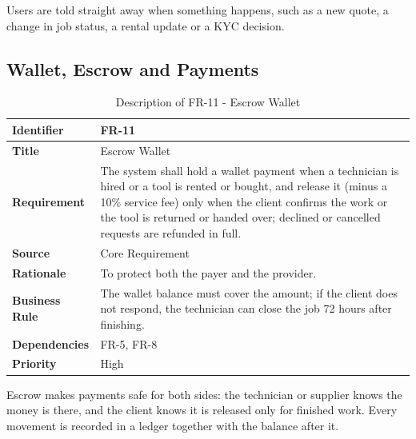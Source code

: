 \documentclass[A4paper,12pt]{report}
\theoremstyle{plain}
\theoremstyle{definition}
\theoremstyle{remark}
\numberwithin{equation}{section}
\begin{document}
Users are told straight away when something happens, such as a new quote, a change in job status, a rental update or a KYC decision.

\subsection{Wallet, Escrow and Payments}

\begin{table}[h!]
\centering
\caption{Description of FR-11 - Escrow Wallet}
\begin{tabular}{|p{}|p{}|}
\hline
\textbf{Identifier} & FR-11 \\ \hline
\textbf{Title} & Escrow Wallet \\ \hline
\textbf{Requirement} & The system shall hold a wallet payment when a technician is hired or a tool is rented or bought, and release it (minus a 10\% service fee) only when the client confirms the work or the tool is returned or handed over; declined or cancelled requests are refunded in full. \\ \hline
\textbf{Source} & Core Requirement \\ \hline
\textbf{Rationale} & To protect both the payer and the provider. \\ \hline
\textbf{Business Rule} & The wallet balance must cover the amount; if the client does not respond, the technician can close the job 72 hours after finishing. \\ \hline
\textbf{Dependencies} & FR-5, FR-8 \\ \hline
\textbf{Priority} & High \\ \hline
\end{tabular}
\end{table}

Escrow makes payments safe for both sides: the technician or supplier knows the money is there, and the client knows it is released only for finished work. Every movement is recorded in a ledger together with the balance after it.
\end{document}
